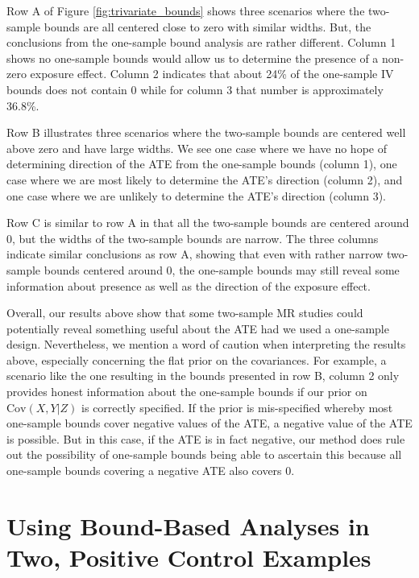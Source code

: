 \documentclass[
]{article}
\theoremstyle{plain}
\begin{document}
Row A of Figure \ref{fig:trivariate_bounds} shows three scenarios where the two-sample bounds are all centered close to zero with similar widths. But, the conclusions from the one-sample bound analysis are rather different. Column 1 shows no one-sample bounds would allow us to determine the presence of a non-zero exposure effect. Column 2 indicates that about 24\% of the one-sample IV bounds does not contain \(0\) while for column 3 that number is approximately 36.8\%.

Row B illustrates three scenarios where the two-sample bounds are centered well above zero and have large widths. We see one case where we have no hope of determining direction of the ATE from the one-sample bounds (column 1), one case where we are most likely to determine the ATE's direction (column 2), and one case where we are unlikely to determine the ATE's direction (column 3).

Row C is similar to row A in that all the two-sample bounds are centered around 0, but the widths of the two-sample bounds are narrow. The three columns indicate similar conclusions as row A, showing that even with rather narrow two-sample bounds centered around 0, the one-sample bounds may still reveal some information about presence as well as the direction of the exposure effect.

Overall, our results above show that some two-sample MR studies could potentially reveal something useful about the ATE had we used a one-sample design. Nevertheless, we mention a word of caution when interpreting the results above, especially concerning the flat prior on the covariances. For example, a scenario like the one resulting in the bounds presented in row B, column 2 only provides honest information about the one-sample bounds if our prior on \(\text{Cov}(X,Y|Z)\) is correctly specified. If the prior is mis-specified whereby most one-sample bounds cover negative values of the ATE, a negative value of the ATE is possible. But in this case, if the ATE is in fact negative, our method does rule out the possibility of one-sample bounds being able to ascertain this because all one-sample bounds covering a negative ATE also covers \(0\).

\hypertarget{using-bound-based-analyses-in-two-positive-control-examples}{%
\section{\texorpdfstring{Using Bound-Based Analyses in Two, Positive Control Examples \label{data-analysis}}{Using Bound-Based Analyses in Two, Positive Control Examples }}\label{using-bound-based-analyses-in-two-positive-control-examples}}
\end{document}
